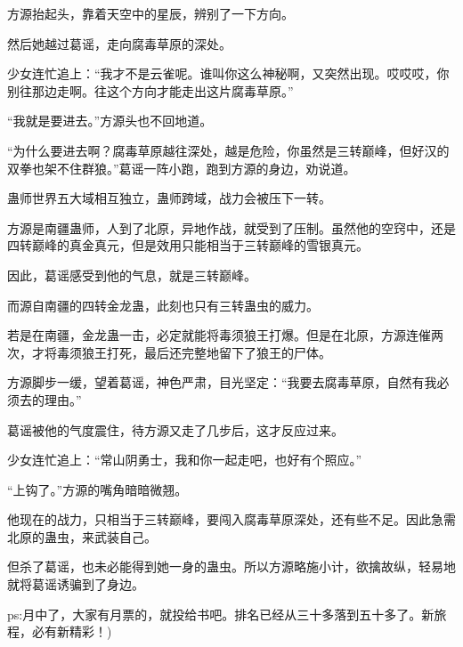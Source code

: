\begin{this_body}
方源抬起头，靠着天空中的星辰，辨别了一下方向。

然后她越过葛谣，走向腐毒草原的深处。

少女连忙追上：“我才不是云雀呢。谁叫你这么神秘啊，又突然出现。哎哎哎，你别往那边走啊。往这个方向才能走出这片腐毒草原。”

“我就是要进去。”方源头也不回地道。

“为什么要进去啊？腐毒草原越往深处，越是危险，你虽然是三转巅峰，但好汉的双拳也架不住群狼。”葛谣一阵小跑，跑到方源的身边，劝说道。

蛊师世界五大域相互独立，蛊师跨域，战力会被压下一转。

方源是南疆蛊师，人到了北原，异地作战，就受到了压制。虽然他的空窍中，还是四转巅峰的真金真元，但是效用只能相当于三转巅峰的雪银真元。

因此，葛谣感受到他的气息，就是三转巅峰。

而源自南疆的四转金龙蛊，此刻也只有三转蛊虫的威力。

若是在南疆，金龙蛊一击，必定就能将毒须狼王打爆。但是在北原，方源连催两次，才将毒须狼王打死，最后还完整地留下了狼王的尸体。

方源脚步一缓，望着葛谣，神色严肃，目光坚定：“我要去腐毒草原，自然有我必须去的理由。”

葛谣被他的气度震住，待方源又走了几步后，这才反应过来。

少女连忙追上：“常山阴勇士，我和你一起走吧，也好有个照应。”

“上钩了。”方源的嘴角暗暗微翘。

他现在的战力，只相当于三转巅峰，要闯入腐毒草原深处，还有些不足。因此急需北原的蛊虫，来武装自己。

但杀了葛谣，也未必能得到她一身的蛊虫。所以方源略施小计，欲擒故纵，轻易地就将葛谣诱骗到了身边。

ps:月中了，大家有月票的，就投给书吧。排名已经从三十多落到五十多了。新旅程，必有新精彩！)

\end{this_body}

